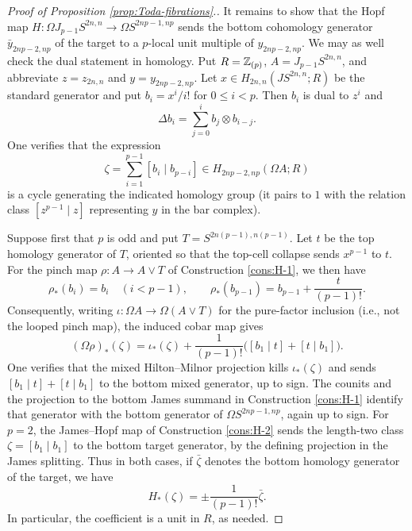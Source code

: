 \documentclass{amsart}
\renewcommand{\NB}[1]{}
\numberwithin{proposition}{section}
\numberwithin{equation}{section}
\begin{document}
\begin{proof}[Proof of Proposition \ref{prop:Toda-fibrations}.]
It remains to show that the Hopf map $H: \Omega J_{p-1} S^{2n,n} \to \Omega S^{2np-1,np}$ sends the bottom cohomology generator $\bar y_{2np-2,np}$ of the target to a $p$-local unit multiple of $y_{2np-2,np}$.
We may as well check the dual statement in homology.
Put $R=\mathbb{Z}_{(p)}$, $A=J_{p-1}S^{2n,n}$, and abbreviate $z=z_{2n,n}$ and $y=y_{2np-2,np}$.
Let $x \in H_{2n,n}(JS^{2n,n};R)$ be the standard generator and put $b_i=x^i/i!$ for $0\le i<p$.
Then $b_i$ is dual to $z^i$ and
\[
  \Delta b_i=\sum_{j=0}^i b_j\otimes b_{i-j}.
\]
One verifies that the expression
\begin{equation} \label{eq:Toda-cobar-generator}
  \zeta=\sum_{i=1}^{p-1}[b_i\mid b_{p-i}]
  \in H_{2np-2,np}(\Omega A;R)
\end{equation}
is a cycle generating the indicated homology group (it pairs to $1$ with the relation class $[z^{p-1}\mid z]$ representing $y$ in the bar complex).

Suppose first that $p$ is odd and put $T=S^{2n(p-1),n(p-1)}$.
Let $t$ be the top homology generator of $T$, oriented so that the top-cell collapse sends $x^{p-1}$ to $t$.
For the pinch map $\rho:A\to A\vee T$ of Construction \ref{cons:H-1}, we then have
\[
  \rho_*(b_i)=b_i\quad (i<p-1),\qquad
  \rho_*(b_{p-1})=b_{p-1}+\frac{t}{(p-1)!}.
\]
Consequently, writing $\iota:\Omega A\to\Omega(A\vee T)$ for the pure-factor inclusion (i.e., not the looped pinch map), the induced cobar map gives
\[
  (\Omega\rho)_*(\zeta)=\iota_*(\zeta)
  +\frac{1}{(p-1)!}\bigl([b_1\mid t]+[t\mid b_1]\bigr).
\]
One verifies\NB{insert?} that the mixed Hilton--Milnor projection kills $\iota_*(\zeta)$ and sends $[b_1\mid t]+[t\mid b_1]$ to the bottom mixed generator, up to sign.
The counits and the projection to the bottom James summand in Construction \ref{cons:H-1} identify that generator with the bottom generator of $\Omega S^{2np-1,np}$, again up to sign.
For $p=2$, the James--Hopf map of Construction \ref{cons:H-2} sends the length-two class $\zeta=[b_1\mid b_1]$ to the bottom target generator, by the defining projection in the James splitting.
Thus in both cases, if $\bar\zeta$ denotes the bottom homology generator of the target, we have
\begin{equation} \label{eq:Toda-Hopf-bottom}
  H_*(\zeta)=\pm\frac{1}{(p-1)!}\bar\zeta.
\end{equation}
In particular, the coefficient is a unit in $R$, as needed.
\end{proof}
\end{document}
